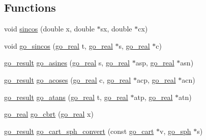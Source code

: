 \subsection*{Functions}
\begin{DoxyCompactItemize}
\item 
void \hyperlink{namespacegomotion_a64138f521669da0b06cd5dee3aa427fc}{sincos} (double x, double $\ast$sx, double $\ast$cx)
\item 
void \hyperlink{namespacegomotion_a085a19f481a6f3f319f644b6dc5fca4b}{go\-\_\-sincos} (\hyperlink{gotypes_8h_afd666a2393eebd71ee455846ac9def9b}{go\-\_\-real} t, \hyperlink{gotypes_8h_afd666a2393eebd71ee455846ac9def9b}{go\-\_\-real} $\ast$s, \hyperlink{gotypes_8h_afd666a2393eebd71ee455846ac9def9b}{go\-\_\-real} $\ast$c)
\item 
\hyperlink{gotypes_8h_a55d48b38cd959f63c7e8db8337a9792a}{go\-\_\-result} \hyperlink{namespacegomotion_a8bf33ee1ceabf5861cb6d8f7fe685880}{go\-\_\-asines} (\hyperlink{gotypes_8h_afd666a2393eebd71ee455846ac9def9b}{go\-\_\-real} s, \hyperlink{gotypes_8h_afd666a2393eebd71ee455846ac9def9b}{go\-\_\-real} $\ast$asp, \hyperlink{gotypes_8h_afd666a2393eebd71ee455846ac9def9b}{go\-\_\-real} $\ast$asn)
\item 
\hyperlink{gotypes_8h_a55d48b38cd959f63c7e8db8337a9792a}{go\-\_\-result} \hyperlink{namespacegomotion_a763dfb5f3ead47a101119bc4ef7a9822}{go\-\_\-acoses} (\hyperlink{gotypes_8h_afd666a2393eebd71ee455846ac9def9b}{go\-\_\-real} c, \hyperlink{gotypes_8h_afd666a2393eebd71ee455846ac9def9b}{go\-\_\-real} $\ast$acp, \hyperlink{gotypes_8h_afd666a2393eebd71ee455846ac9def9b}{go\-\_\-real} $\ast$acn)
\item 
\hyperlink{gotypes_8h_a55d48b38cd959f63c7e8db8337a9792a}{go\-\_\-result} \hyperlink{namespacegomotion_a6af3a55c31db0c4b47aa157de48ae829}{go\-\_\-atans} (\hyperlink{gotypes_8h_afd666a2393eebd71ee455846ac9def9b}{go\-\_\-real} t, \hyperlink{gotypes_8h_afd666a2393eebd71ee455846ac9def9b}{go\-\_\-real} $\ast$atp, \hyperlink{gotypes_8h_afd666a2393eebd71ee455846ac9def9b}{go\-\_\-real} $\ast$atn)
\item 
\hyperlink{gotypes_8h_afd666a2393eebd71ee455846ac9def9b}{go\-\_\-real} \hyperlink{namespacegomotion_a11b672dbc5c887c373bd7421c4d74744}{go\-\_\-cbrt} (\hyperlink{gotypes_8h_afd666a2393eebd71ee455846ac9def9b}{go\-\_\-real} x)
\item 
\hyperlink{gotypes_8h_a55d48b38cd959f63c7e8db8337a9792a}{go\-\_\-result} \hyperlink{namespacegomotion_a83b84d0103b59f7ec48a5d50d3633b0d}{go\-\_\-cart\-\_\-sph\-\_\-convert} (const \hyperlink{structgomotion_1_1go__cart}{go\-\_\-cart} $\ast$v, \hyperlink{structgomotion_1_1go__sph}{go\-\_\-sph} $\ast$s)

\end{DoxyCompactItemize}
